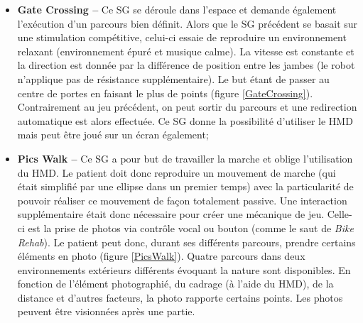 \begin{itemize}
\begin{itemize}
			\item \textbf{Gate Crossing --} Ce SG se déroule dans l'espace et demande également l'exécution d'un parcours bien définit. Alors que le SG précédent se basait sur une stimulation compétitive, celui-ci essaie de reproduire un environnement relaxant (environnement épuré et musique calme). La vitesse est constante et la direction est donnée par la différence de position entre les jambes (le robot n'applique pas de résistance supplémentaire). Le but étant de passer au centre de portes en faisant le plus de points (figure \ref{GateCrossing}). Contrairement au jeu précédent, on peut sortir du parcours et une redirection automatique est alors effectuée. Ce SG donne la possibilité d'utiliser le HMD mais peut être joué sur un écran également;\medskip
			
			\begin{minipage}{\linewidth}
				\label{GateCrossing}
			\end{minipage}\medskip
			
			\item \textbf{Pics Walk --} Ce SG a pour but de travailler la marche et oblige l'utilisation du HMD. Le patient doit donc reproduire un mouvement de marche (qui était simplifié par une ellipse dans un premier temps) avec la particularité de pouvoir réaliser ce mouvement de façon totalement passive. Une interaction supplémentaire était donc nécessaire pour créer une mécanique de jeu. Celle-ci est la prise de photos via contrôle vocal ou bouton (comme le saut de \textit{Bike Rehab}). Le patient peut donc, durant ses différents parcours, prendre certains éléments en photo (figure \ref{PicsWalk}). Quatre parcours dans deux environnements extérieurs différents évoquant la nature sont disponibles. En fonction de l'élément photographié, du cadrage (à l'aide du HMD), de la distance et d'autres facteurs, la photo rapporte certains points. Les photos peuvent être visionnées après une partie.\medskip
			

\end{itemize}
\end{itemize}
